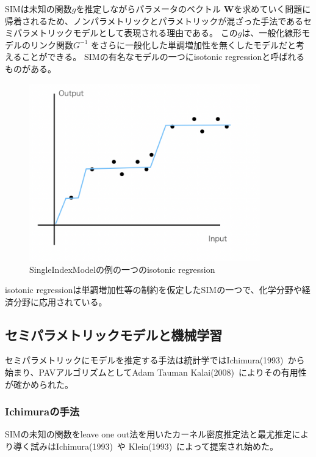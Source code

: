 SIMは未知の関数$ g $を推定しながらパラメータのベクトル $ \mathbf{W} $を求めていく問題に帰着されるため、ノンパラメトリックとパラメトリックが混ざった手法であるセミパラメトリックモデルとして表現される理由である。
この$ g $は、一般化線形モデルのリンク関数$ G^{-1} $ をさらに一般化した単調増加性を無くしたモデルだと考えることができる。
SIMの有名なモデルの一つにisotonic regressionと呼ばれるものがある。

\begin{figure}[hbtp]

    \begin{center}
        \includegraphics[width=10cm]{asset/isotonic_regression.png}
            \caption{SingleIndexModelの例の一つのisotonic regression}
            \label{isotonic_regression}
    \end{center}
\end{figure}

isotonic regressionは単調増加性等の制約を仮定したSIMの一つで、化学分野や経済分野に応用されている。


\subsection {セミパラメトリックモデルと機械学習}

セミパラメトリックにモデルを推定する手法は統計学ではIchimura(1993)~\cite{ichimura}から始まり、PAVアルゴリズムとしてAdam Tauman Kalai(2008)~\cite{isotron}によりその有用性が確かめられた。

\subsubsection{Ichimuraの手法}

SIMの未知の関数をleave one out法を用いたカーネル密度推定法と最尤推定により導く試みはIchimura(1993)~\cite{ichimura}や Klein(1993)~\cite{klein}によって提案され始めた。

